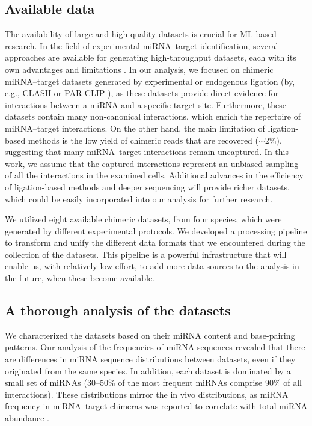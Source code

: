 \documentclass{bmcart}
\begin{document}
\subsection*{Available data}
The availability of large and high-quality datasets is crucial for ML-based research. In the field of experimental miRNA--target identification, several approaches are available for generating high-throughput datasets, each with its own advantages and limitations \cite{li2019current, martinez2013microrna}. In our analysis, we focused on chimeric miRNA--target datasets generated by experimental or endogenous ligation (by, e.g., CLASH \cite{helwak2013mapping} or PAR-CLIP \cite{grosswendt2014unambiguous}), as these datasets provide direct evidence for interactions between a miRNA and a specific target site. Furthermore, these datasets contain many non-canonical interactions, which enrich the repertoire of miRNA--target interactions. On the other hand, the main limitation of ligation-based methods is the low yield of chimeric reads that are recovered ($\sim 2$\%), suggesting that many miRNA--target interactions remain uncaptured. In this work, we assume that the captured interactions represent an unbiased sampling of all the interactions in the examined cells. Additional advances in the efficiency of ligation-based methods and deeper sequencing will provide richer datasets, which could be easily incorporated into our analysis for further research.  

We utilized eight available chimeric datasets, from four species, which were generated by different experimental protocols. We developed a processing pipeline to transform and unify the different data formats that we encountered during the collection of the datasets. This pipeline is a powerful infrastructure that will enable us, with relatively low effort, to add more data sources to the analysis in the future, when these become available. 

\subsection*{A thorough analysis of the datasets}
We characterized the datasets based on their miRNA content and base-pairing patterns.
Our analysis of the frequencies of miRNA sequences revealed that there are differences in miRNA sequence distributions between datasets, even if they originated from the same species. In addition, each dataset is dominated by a small set of miRNAs (30--50\% of the most frequent miRNAs comprise 90\% of all interactions). These distributions mirror the in vivo distributions, as miRNA frequency in miRNA--target chimeras was reported to correlate with total miRNA abundance \cite{darnell_moore2015mirna}.
\end{document}
